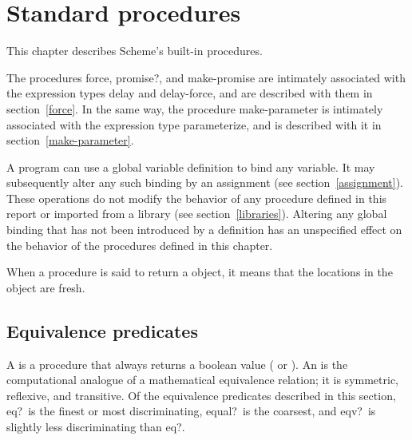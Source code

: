 
\chapter{Standard procedures}
\label{initialenv}
\label{builtinchapter}


This chapter describes Scheme's built-in procedures.

The procedures {\cf force}, {\cf promise?}, and {\cf make-promise} are intimately associated
with the expression types {\cf delay} and {\cf delay-force}, and are described
with them in section~\ref{force}.  In the same way, the procedure
{\cf make-parameter} is intimately associated with the expression type
{\cf parameterize}, and is described with it in section~\ref{make-parameter}.

A program can use a global variable definition to bind any variable.  It may
subsequently alter any such binding by an assignment (see
section~\ref{assignment}).  These operations do not modify the behavior of
any procedure defined in this report or imported from a library
(see section~\ref{libraries}).  Altering any global binding that has
not been introduced by a definition has an unspecified effect on the
behavior of the procedures defined in this chapter.

When a procedure is said to return a  object,
it means that the locations in the object are fresh.

\section{Equivalence predicates}
\label{equivalencesection}

A  is a procedure that always returns a boolean
value (\schtrue{} or \schfalse).  An  is
the computational analogue of a mathematical equivalence relation; it is
symmetric, reflexive, and transitive.  Of the equivalence predicates
described in this section, {\cf eq?}\ is the finest or most
discriminating, {\cf equal?}\ is the coarsest, and {\cf eqv?}\ is
slightly less discriminating than {\cf eq?}.



